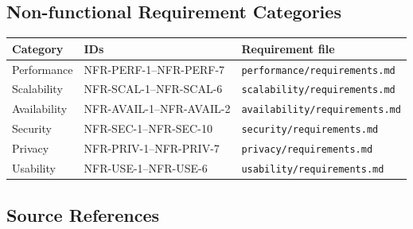 \documentclass[12pt]{article}
\renewcommand{\baselinestretch}{1.5}
\begin{document}
\hypertarget{sec:non-functional-requirement-categories}{}
\subsection*{Non-functional Requirement Categories}
\par\medskip

\begingroup
\small
\renewcommand{\baselinestretch}{1.0}\selectfont
\renewcommand{\arraystretch}{1.15}
\setlength{\tabcolsep}{6pt}
\begin{longtable}{|>{\raggedright\arraybackslash}p{}|>{\raggedright\arraybackslash}p{}|>{\raggedright\arraybackslash}p{}|}
\hline
\textbf{Category} & \textbf{IDs} & \textbf{Requirement file} \\ \hline
\endhead
Performance & NFR-PERF-1--NFR-PERF-7 & \texttt{\texttt{performance/requirements.md}} \\ \hline
Scalability & NFR-SCAL-1--NFR-SCAL-6 & \texttt{\texttt{scalability/requirements.md}} \\ \hline
Availability & NFR-AVAIL-1--NFR-AVAIL-2 & \texttt{\texttt{availability/requirements.md}} \\ \hline
Security & NFR-SEC-1--NFR-SEC-10 & \texttt{\texttt{security/requirements.md}} \\ \hline
Privacy & NFR-PRIV-1--NFR-PRIV-7 & \texttt{\texttt{privacy/requirements.md}} \\ \hline
Usability & NFR-USE-1--NFR-USE-6 & \texttt{\texttt{usability/requirements.md}} \\ \hline
\end{longtable}
\endgroup
\par\medskip

\hypertarget{sec:source-references}{}
\subsection*{Source References}
\par\medskip
\end{document}
